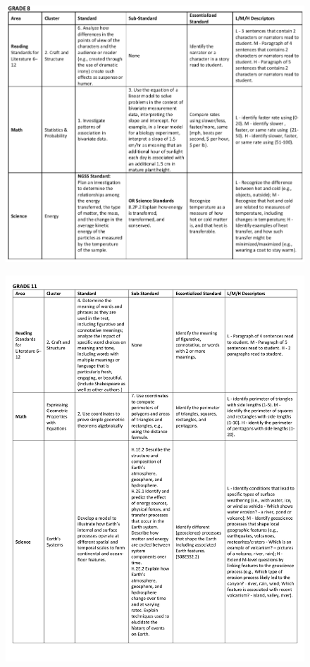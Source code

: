 \documentclass[]{article}
\begin{document}
\begin{figure}
\centering
\includegraphics{Figures/Standards/Grade8.png}
\caption{}
\end{figure}

\begin{figure}
\centering
\includegraphics{Figures/Standards/Grade11.pdf}
\caption{}
\end{figure}
\end{document}
